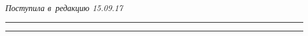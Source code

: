 \vspace*{-3pt}





\hfill{\small\textit{Поступила в~редакцию 15.09.17}}














\vspace*{4pt}





\hrule





\vspace*{2pt}















\hrule





\vspace*{6pt}











\def\tit{BANS OF PROBABILITY MEASURES\\ IN~THE~PROBLEM 


OF~INSIDER DETECTION}





\def\titkol{Bans of~probability measures in~the~problem of~insider 


detection}








\def\aut{E.\,A.~Martyanov}


\def\autkol{E.\,A.~Martyanov}











